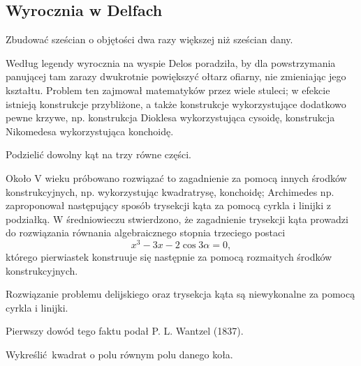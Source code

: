 \subsection{Wyrocznia w Delfach}
\begin{problem}
    Zbudować sześcian o objętości dwa razy większej niż sześcian dany.
\end{problem}

Według legendy wyrocznia na wyspie Delos poradziła, by dla powstrzymania panującej tam zarazy dwukrotnie powiększyć ołtarz ofiarny, nie zmieniając jego kształtu.
Problem ten zajmował matematyków przez wiele stuleci; w efekcie istnieją konstrukcje przybliżone, a także konstrukcje wykorzystujące dodatkowo pewne krzywe, np. konstrukcja Dioklesa wykorzystująca cysoidę, konstrukcja Nikomedesa wykorzystująca konchoidę.

\begin{problem}
    Podzielić dowolny kąt na trzy równe części.
\end{problem}

Około V wieku próbowano rozwiązać to zagadnienie za pomocą innych środków konstrukcyjnych, np. wykorzystując kwadratrysę, konchoidę; Archimedes np. zaproponował następujący sposób trysekcji kąta za pomocą cyrkla i linijki z podziałką.
W średniowieczu stwierdzono, że zagadnienie trysekcji kąta prowadzi do rozwiązania równania algebraicznego stopnia trzeciego postaci
\begin{equation}
    x^3 - 3 x - 2 \cos 3\alpha = 0,
\end{equation}
którego pierwiastek konstruuje się następnie za pomocą rozmaitych środków konstrukcyjnych.

\begin{proposition}
    Rozwiązanie problemu delijskiego oraz trysekcja kąta są niewykonalne za pomocą cyrkla i linijki.
\end{proposition}

Pierwszy dowód tego faktu podał P. L. Wantzel (1837).

\begin{problem}
    Wykreślić kwadrat o polu równym polu danego koła.
\end{problem}

